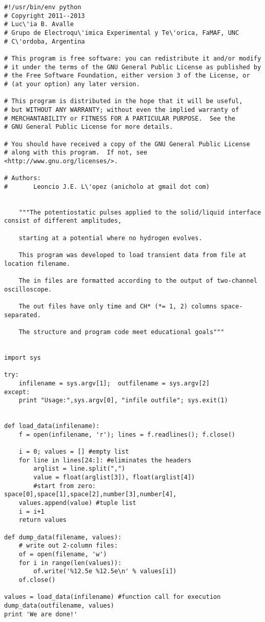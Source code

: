\documentclass[a4paper]{article}
\begin{document}
\begin{verbatim}
#!/usr/bin/env python
# Copyright 2011--2013
# Luc\'ia B. Avalle
# Grupo de Electroqu\'imica Experimental y Te\'orica, FaMAF, UNC
# C\'ordoba, Argentina

# This program is free software: you can redistribute it and/or modify
# it under the terms of the GNU General Public License as published by
# the Free Software Foundation, either version 3 of the License, or
# (at your option) any later version.

# This program is distributed in the hope that it will be useful,
# but WITHOUT ANY WARRANTY; without even the implied warranty of
# MERCHANTABILITY or FITNESS FOR A PARTICULAR PURPOSE.  See the
# GNU General Public License for more details.

# You should have received a copy of the GNU General Public License
# along with this program.  If not, see <http://www.gnu.org/licenses/>.

# Authors:
#       Leoncio J.E. L\'opez (anicholo at gmail dot com)


    """The potentiostatic pulses applied to the solid/liquid interface consist of different amplitudes, 

    starting at a potential where no hydrogen evolves.

    This program was developed to load transient data from file at location filename. 
    
    The in files are formatted according to the output of two-channel oscilloscope. 

    The out files have only time and CH* (*= 1, 2) columns space-separated. 

    The structure and program code meet educational goals"""


import sys

try:
    infilename = sys.argv[1];  outfilename = sys.argv[2]
except:
    print "Usage:",sys.argv[0], "infile outfile"; sys.exit(1)


def load_data(infilename):
    f = open(infilename, 'r'); lines = f.readlines(); f.close()

    i = 0; values = [] #empty list
    for line in lines[24:]: #eliminates the headers
        arglist = line.split(",")
        value = float(arglist[3]), float(arglist[4]) 
        #start from zero: space[0],space[1],space[2],number[3],number[4],
	values.append(value) #tuple list
	i = i+1
    return values

def dump_data(filename, values):
    # write out 2-column files:
    of = open(filename, 'w')
    for i in range(len(values)):
        of.write('%12.5e %12.5e\n' % values[i]) 
    of.close()

values = load_data(infilename) #function call for execution
dump_data(outfilename, values)
print 'We are done!'
\end{verbatim}
\end{document}
